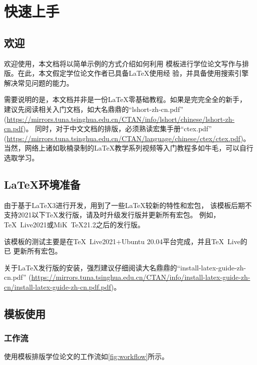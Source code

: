 
\chapter{快速上手}

\section{欢迎}

欢迎使用\nwafuthesis{}，本文档将以简单示例的方式介绍如何利用\nwafuthesis{}
模板进行学位论文写作与排版。在此，本文假定学位论文作者已具备\LaTeX{}使用经
验，并具备使用搜索引擎解决常见问题的能力。

需要说明的是，本文档并非是一份\LaTeX{}零基础教程。如果是完完全全的新手，
建议先阅读相关入门文档，如大名鼎鼎的\enquote{lshort-zh-cn.pdf}
(\url{https://mirrors.tuna.tsinghua.edu.cn/CTAN/info/lshort/chinese/lshort-zh-cn.pdf})。
同时，对于中文文档的排版，必须熟读\CTeX{}宏集手册\enquote{ctex.pdf}
(\url{https://mirrors.tuna.tsinghua.edu.cn/CTAN/language/chinese/ctex/ctex.pdf})。
当然，网络上诸如耿楠录制的\LaTeX{}教学系列视频等入门教程多如牛毛，可以自行
选取学习。

\section{\LaTeX 环境准备}

由于\nwafuthesis{}基于\LaTeX3进行开发，用到了一些\LaTeX{}较新的特性和宏包，
该模板后期不支持2021以下\TeX{}发行版，请及时升级发行版并更新所有宏包。
例如，\TeX~Live2021或MiK~\TeX21.2之后的发行版。

该模板的测试主要是在\TeX~Live2021+Ubuntu 20.04平台完成，并且\TeX~Live的已
更新所有宏包。

关于\LaTeX{}发行版的安装，强烈建议仔细阅读大名鼎鼎的\enquote{install-latex-guide-zh-cn.pdf}
(\url{https://mirrors.tuna.tsinghua.edu.cn/CTAN/info/install-latex-guide-zh-cn/install-latex-guide-zh-cn.pdf.pdf})。

\section{模板使用}

\subsection{工作流}
使用{\nwafuthesis}模板排版学位论文的工作流如\ref{fig:workflow}所示。

